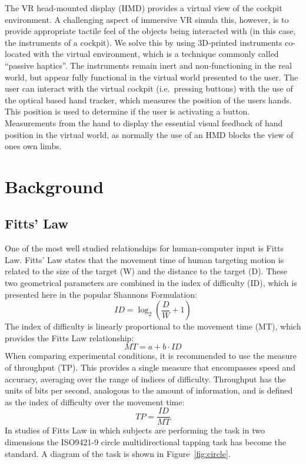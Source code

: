 \documentclass[]{aiaa-tc}%
\begin{document}
The VR head-mounted display (HMD) provides a virtual view of the cockpit environment.
A challenging aspect of immersive VR simula this, however, is to provide appropriate tactile feel of the objects being interacted with (in this case, the instruments of a cockpit).
We solve this by using 3D-printed instruments co-located with the virtual environment, which is a technique commonly called ``passive haptics''.
The instruments remain inert and non-functioning in the real world, but appear fully functional in the virtual world presented to the user.
The user can interact with the virtual cockpit (i.e.\ pressing buttons) with the use of the optical based hand tracker, which measures the position of the users hands.
This position is used to determine if the user is activating a button.
Measurements from the hand to display the essential visual feedback of hand position in the virtual world, as normally the use of an HMD blocks the view of ones own limbs.

\section{Background}
\subsection{Fitts' Law}
One of the most well studied relationships for human-computer input is Fitts Law\cite{fitts_information_1954}.
Fitts' Law states that the movement time of human targeting motion is related to the size of the target (W) and the distance to the target (D).
These two geometrical parameters are combined in the index of difficulty (ID), which is presented here in the popular Shannons Formulation\cite{mackenzie_note_1989}:
\begin{equation}
  ID=\log_2\left(\frac{D}{W}+1\right)
\end{equation}
The index of difficulty is linearly proportional to the movement time (MT), which provides the Fitts Law relationship:
\begin{equation}
  MT=a+b \cdot ID
\end{equation}
When comparing experimental conditions, it is recommended to use the measure of throughput (TP)\cite{soukoreff_towards_2004}.
This provides a single measure that encompasses speed and accuracy, averaging over the range of indices of difficulty.
Throughput has the units of bits per second, analogous to the amount of information, and is defined as the index of difficulty over the movement time:
\begin{equation}
  TP=\frac{ID}{MT}
\end{equation}
In studies of Fitts Law in which subjects are performing the task in two dimensions the ISO9421-9 circle multidirectional tapping task has become the standard\cite{international_organization_for_standardization_iso_2000}.
A diagram of the task is shown in Figure~\ref{fig:circle}.
\end{document}
